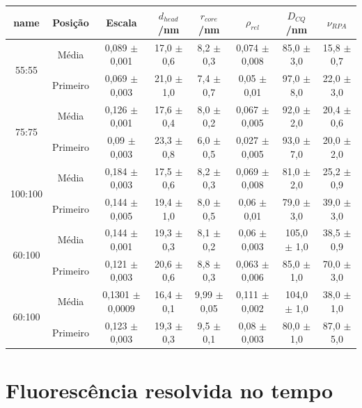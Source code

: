 			\begin{table}[h]
		{%
			\begin{tabular}{c c | c c c c c c}
				\toprule
				            name             & Posição  & Escala                & \(d_{head}\)/nm    & \(r_{core}\)/nm       & \(\rho_{rel}\)        & \(D_{CQ}\)/nm     & \(\nu_{RPA}\)      \\ \midrule
				   \multirow{2}{*}{55:55}    & Média    & 0,089  \(\pm\) 0,001  & 17,0   \(\pm\) 0,6 & 8,2      \(\pm\) 0,3  & 0,074   \(\pm\) 0,008 & 85,0  \(\pm\) 3,0 & 15,8   \(\pm\) 0,7 \\
				                             & Primeiro & 0,069  \(\pm\) 0,003  & 21,0   \(\pm\) 1,0 & 7,4      \(\pm\) 0,7  & 0,05    \(\pm\) 0,01  & 97,0  \(\pm\) 8,0 & 22,0   \(\pm\) 3,0 \\
				   \multirow{2}{*}{75:75}    & Média    & 0,126  \(\pm\) 0,001  & 17,6   \(\pm\) 0,4 & 8,0      \(\pm\) 0,2  & 0,067   \(\pm\) 0,005 & 92,0  \(\pm\) 2,0 & 20,4   \(\pm\) 0,6 \\
				                             & Primeiro & 0,09   \(\pm\) 0,003  & 23,3   \(\pm\) 0,8 & 6,0      \(\pm\) 0,5  & 0,027   \(\pm\) 0,005 & 93,0  \(\pm\) 7,0 & 20,0   \(\pm\) 2,0 \\
				  \multirow{2}{*}{100:100}   & Média    & 0,184  \(\pm\) 0,003  & 17,5   \(\pm\) 0,6 & 8,2      \(\pm\) 0,3  & 0,069   \(\pm\) 0,008 & 81,0  \(\pm\) 2,0 & 25,2   \(\pm\) 0,9 \\
				                             & Primeiro & 0,144  \(\pm\) 0,005  & 19,4   \(\pm\) 1,0 & 8,0      \(\pm\) 0,5  & 0,06    \(\pm\) 0,01  & 79,0  \(\pm\) 3,0 & 39,0   \(\pm\) 3,0 \\
				  \multirow{2}{*}{60:100}    & Média    & 0,144  \(\pm\) 0,001  & 19,3   \(\pm\) 0,3 & 8,1      \(\pm\) 0,2  & 0,06    \(\pm\) 0,003 & 105,0 \(\pm\) 1,0 & 38,5   \(\pm\) 0,9 \\
				                             & Primeiro & 0,121  \(\pm\) 0,003  & 20,6   \(\pm\) 0,6 & 8,8      \(\pm\) 0,3  & 0,063   \(\pm\) 0,006 & 85,0  \(\pm\) 1,0 & 70,0   \(\pm\) 3,0 \\
				\multirow{2}{*}{60:100} 1,5m & Média    & 0,1301 \(\pm\) 0,0009 & 16,4   \(\pm\) 0,1 & 9,99     \(\pm\) 0,05 & 0,111   \(\pm\) 0,002 & 104,0 \(\pm\) 1,0 & 38,0   \(\pm\) 1,0 \\
				                             & Primeiro & 0,123  \(\pm\) 0,003  & 19,3   \(\pm\) 0,3 & 9,5      \(\pm\) 0,1  & 0,08    \(\pm\) 0,003 & 80,0  \(\pm\) 1,0 & 87,0   \(\pm\) 5,0 \\ \bottomrule
			\end{tabular}
		}{}
	\end{table}  
	
	\chapter{Fluorescência resolvida no tempo}